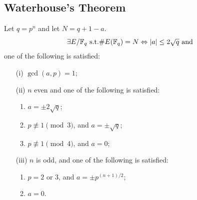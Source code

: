 \documentclass[10pt,handout]{beamer} %
\begin{document}
\subsection{Waterhouse's Theorem}
\begin{frame}[label=current]
\begin{theorem}[Waterhouse]\pause
\label{lem:Water}
 Let $q=p^n$ and let $N = q + 1-a$.
 $$\exists E/\mathbb F_q\text{ s.t.}\#E(\mathbb F_q) = N\Leftrightarrow|a|\le 2\sqrt q\text{ and}$$
 one of the following is satisfied:\pause
\begin{itemize}[<+-| alert@+>]
\item[(i)] $\gcd(a, p) = 1$;
\item[(ii)] $n$ even and one of the following is satisfied:
\begin{enumerate}
  \item $a=\pm 2\sqrt q$;
  \item $p\not\equiv 1 \pmod 3$, and $a = \pm\sqrt q$;
  \item $p\not\equiv 1 \pmod 4$, and $a = 0$;
\end{enumerate}
\item[(iii)] $n$ is odd, and one of the following is satisfied:
 \begin{enumerate}
   \item $p = 2$ or $3$, and $a = \pm p^{(n+1)/2}$;
   \item $a = 0$.
 \end{enumerate}
 \end{itemize}
\end{theorem}


\end{frame}
\end{document}
